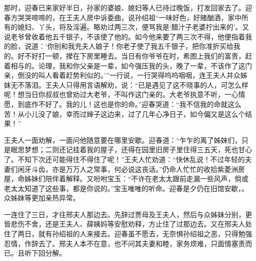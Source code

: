 \documentclass[12pt,oneside]{book}
\begin{document}
那时，迎春已来家好半日，孙家的婆娘、媳妇等人已待过晚饭，打发回家去了。迎春方哭哭啼啼的，在王夫人房中诉委曲，说孙绍祖“一味好色，好赌酗酒，家中所有的媳妇、丫头，将及淫遍。略劝过两三次，便骂我是‘醋汁子老婆拧出来的’。又说老爷曾收着他五千银子，不该使了他的。如今他来要了两三次不得，他便指着我的脸，说道：‘你别和我充夫人娘子！你老子使了我五千银子，把你准折买给我的。好不好打一顿，撵在下房里睡去。当日有你爷爷在时，希图上我们的富贵，赶着相与的。论理，我和你父亲是一辈，如今强压我的头，晚了一辈，不该作了这门亲，倒没的叫人看着赶势利似的。’”一行说，一行哭得呜呜咽咽，连王夫人并众姊妹无不落泪。王夫人只得用言语解劝，说：“已是遇见了这不晓事的人，可怎么样呢！想当日你叔叔也曾劝过大老爷，不叫作这门亲的。大老爷执意不听，一心情愿，到底作不好了。我的儿！这也是你的命。”迎春哭道：“我不信我的命就这么苦！从小儿没了娘，幸而过婶子这边来，过了几年心净日子，如今偏又是这么个结果！”

王夫人一面劝解，一面问他随意要在哪里安歇。迎春道：“乍乍的离了姊妹们，只是眠思梦想；二则还记挂着我的屋子，还得在园里旧房子里住得三五天，死也甘心了。不知下次还可能得住不得住了呢！”王夫人忙劝道：“快休乱说！不过年轻的夫妻们闲牙斗齿，亦是万万人之常事，何必说这丧话。”仍命人忙忙的收拾紫菱洲房屋，命姊妹们陪伴着解释。又吩咐宝玉：“不许在老太太跟前走漏一些风声，倘或老太太知道了这些事，都是你说的。”宝玉唯唯的听命。迎春是夕仍在旧馆安歇，。众姊妹等更加亲热异常。

一连住了三日，才往邢夫人那边去。先辞过贾母及王夫人，然后与众姊妹分别，更皆悲伤不舍，还是王夫人、薛姨妈等安慰劝释，方止住了过那边去。又在邢夫人处住了两日，就有孙绍祖的人来接去。迎春虽不愿去，无奈惧孙绍祖之恶，只得勉强忍情，作辞去了。邢夫人本不在意，也不问其夫妻和睦，家务烦难，只面情塞责而已。且听下回分解。
\end{document}
